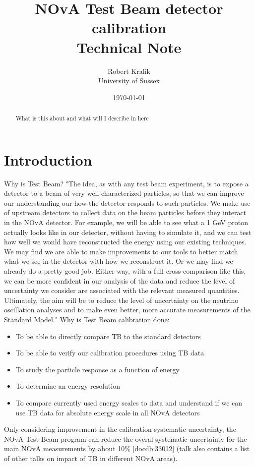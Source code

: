 \documentclass[12pt,a4paper]{article}
\author{Robert Kralik\\\small{University of Sussex}}
\title{NOvA Test Beam detector calibration\\ \vspace*{5mm}
\Large{Technical Note}}
\date{\today}
\begin{document}
\maketitle
\begin{abstract}
What is this about and what will I describe in here
\end{abstract}
\tableofcontents
\newpage

\section{Introduction}
Why is Test Beam?
"The idea, as with any test beam experiment, is to expose a detector to a beam of very well-characterized particles, so that we can improve our understanding our how the detector responds to such particles. We make use of upstream detectors to collect data on the beam particles before they interact in the NOvA detector. For example, we will be able to see what a 1 GeV proton actually looks like in our detector, without having to simulate it, and we can test how well we would have reconstructed the energy using our existing techniques. We may find we are able to make improvements to our tools to better match what we see in the detector with how we reconstruct it. Or we may find we already do a pretty good job. Either way, with a full cross-comparison like this, we can be more confident in our analysis of the data and reduce the level of uncertainty we consider are associated with the relevant measured quantities. Ultimately, the aim will be to reduce the level of uncertainty on the neutrino oscillation analyses and to make even better, more accurate measurements of the Standard Model."%
Why is Test Beam calibration done:
\begin{itemize}
\item To be able to directly compare TB to the standard detectors
\item To be able to verify our calibration procedures using TB data
\item To study the particle response as a function of energy 
\item To determine an energy resolution
\item To compare currently used energy scales to data and understand if we can use TB data for absolute energy scale in all NOvA detectors
\end{itemize}

Only considering improvement in the calibration systematic uncertainty, the NOvA Test Beam program can reduce the overal systematic uncertainty for the main NOvA measurements by about 10\% [docdb:33012] (talk also contains a list of other talks on impact of TB in different NOvA areas).
\end{document}
